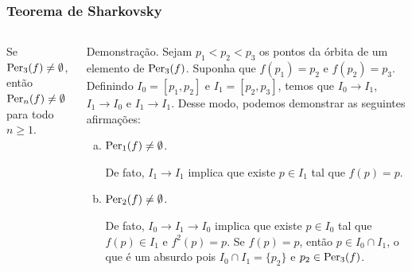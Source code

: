 \begin{frame}
\vspace{5pt}
\frametitle{Teorema de Sharkovsky}
\begin{columns}
\column{\dimexpr\paperwidth-15pt}

\begin{theorem}\label{teo 9-2}
Se $\operatorname{Per}_3(f) \neq \emptyset$, então $\operatorname{Per}_n(f) \neq \emptyset$ para todo $n \geq 1$.
\end{theorem}

\begin{block}{Demonstração.}
Sejam $p_1 < p_2 < p_3$ os pontos da órbita de um elemento de $\operatorname{Per}_3(f)$. Suponha que $f(p_1) = p_2$ e $f(p_2) = p_3$.
Definindo $I_0 = [p_1, p_2]$ e $I_1 = [p_2, p_3]$, temos que $I_0 \longrightarrow I_1$, $I_1 \longrightarrow I_0$ e $I_1 \longrightarrow I_1$. Desse modo, podemos demonstrar as seguintes afirmações:

\begin{enumerate}[a)]
\item \textit{$\operatorname{Per}_1(f) \neq \emptyset$.}

De fato, $I_1 \longrightarrow I_1$ implica que existe $p \in I_1$ tal que $f(p) = p$.

\item \textit{$\operatorname{Per}_2(f) \neq \emptyset$.}

De fato, $I_0 \longrightarrow I_1 \longrightarrow I_0$ implica que existe $p \in I_0$ tal que $f(p) \in I_1$ e $f^2(p) = p$.
Se $f(p) = p$, então $p \in I_0 \cap I_1$, o que é um absurdo pois $I_0 \cap I_1 = \lbrace p_2 \rbrace$ e $p_2 \in \operatorname{Per}_3(f)$.
\end{enumerate}
\end{block}

\end{columns}
\end{frame}



